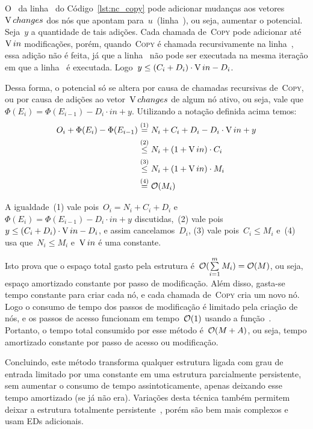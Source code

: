 \documentclass[main.tex]{subfiles}
\begin{document}
O~ da linha~ do Código~\ref{lst:nc_copy} pode adicionar mudanças aos vetores~$\operatorname{V}{changes}$ dos nós que apontam para~$u$~(linha~), ou seja, aumentar o potencial. Seja~$y$ a quantidade de tais adições. Cada chamada de~\textsc{Copy} pode adicionar até~$\operatorname{V}{in}$ modificações, porém, quando~\textsc{Copy} é chamada recursivamente na linha~, essa adição não é feita, já que a linha~ não pode ser executada na mesma iteração em que a linha~ é executada. Logo~${y \leq (C_i + D_i) \cdot \operatorname{V}{in} - D_i}$.

Dessa forma, o potencial só se altera por causa de chamadas recursivas de~\textsc{Copy}, ou por causa de adições ao vetor~$\operatorname{V}{changes}$ de algum nó ativo, ou seja, vale que~$\Phi(E_i) = \Phi(E_{i-1}) - D_i \cdot in + y$.
Utilizando a notação definida acima temos:
\begin{align*}
	O_i + \Phi(E_i) - \Phi(E_{i-1}) & \stackrel{\text{(1)}}{=} N_i + C_i + D_i - D_i \cdot \operatorname{V}{in} + y
	\\ &\stackrel{\text{(2)}}{\leq} N_i + (1 + \operatorname{V}{in})\cdot C_i
	\\ &\stackrel{\text{(3)}}{\leq} N_i + (1 + \operatorname{V}{in}) \cdot M_i
	\\ &\stackrel{\text{(4)}}{=} \mathcal{O}(M_i)
\end{align*}

A igualdade~(1) vale pois~${O_i = N_i + C_i + D_i}$ e~${\Phi(E_i) = \Phi(E_{i-1}) - D_i \cdot in + y}$ discutidas,~(2) vale pois~${y \leq (C_i + D_i) \cdot \operatorname{V}{in} - D_i}$, e assim cancelamos~$D_i$, (3) vale pois~${C_i \leq M_i}$ e~(4) usa que~${N_i \leq M_i}$ e~${\operatorname{V}{in}}$ é uma constante.

Isto prova que o espaço total gasto pela estrutura é~${\mathcal{O}(\sum\limits_{i=1}^m{M_i}) = \mathcal{O}(M)}$, ou seja, espaço amortizado constante por passo de modificação. Além disso, gasta-se tempo constante para criar cada nó, e cada chamada de~\textsc{Copy} cria um novo nó. Logo o consumo de tempo dos passos de modificação é limitado pela criação de nós, e os passos de acesso funcionam em tempo~$\mathcal{O}(1)$ usando a função~. Portanto, o tempo total consumido por esse método é~$\mathcal{O}(M+A)$, ou seja, tempo amortizado constante por passo de acesso ou modificação.

Concluindo, este método transforma qualquer estrutura ligada com grau de entrada limitado por uma constante em uma estrutura parcialmente persistente, sem aumentar o consumo de tempo assintoticamente, apenas deixando esse tempo amortizado (se já não era). Variações desta técnica também permitem deixar a estrutura totalmente persistente~\cite{DriscollSST1989}, porém são bem mais complexos e usam EDs adicionais.
\end{document}
